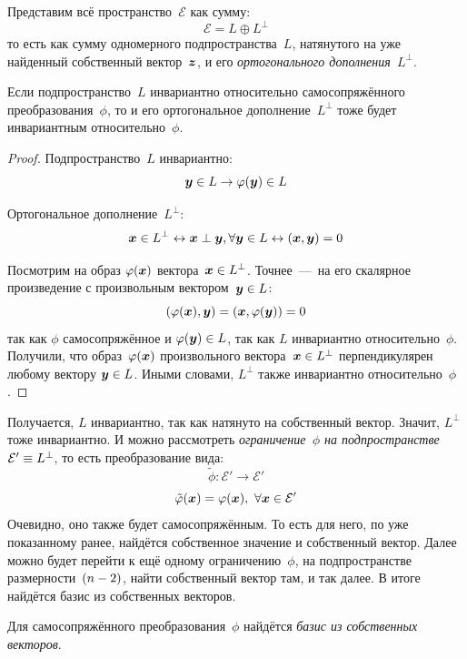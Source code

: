\documentclass[a4paper,12pt]{article}
\theoremstyle{remark}
\begin{document}
  Представим всё пространство~$\mathcal E$ как сумму:
  \[
    \mathcal E = L \oplus L^{\perp}
  \]
  то есть как сумму одномерного подпространства~$L$, натянутого на уже найденный собственный вектор~$\boldsymbol z$, и его \emph{ортогонального дополнения~$L^{\perp}$}.
  
  \begin{proposition}
    Если подпространство~$L$ инвариантно относительно самосопряжённого преобразования~$\phi$, то и его ортогональное дополнение~$L^{\perp}$ тоже будет инвариантным относительно~$\phi$.
  \end{proposition}
  
  \begin{proof}
    Подпространство~$L$ инвариантно:
    \[
      \boldsymbol y \in L \rightarrow \varphi(\boldsymbol y) \in L
    \]
    
    Ортогональное дополнение~$L^{\perp}$:
    \[
      \boldsymbol x \in L^{\perp}
      \leftrightarrow \boldsymbol x \perp \boldsymbol y, \forall \boldsymbol y \in L
      \leftrightarrow (\boldsymbol x, \boldsymbol y) = 0
    \]
    
    Посмотрим на образ $\varphi(\boldsymbol x)$ вектора~$\bds x \hm\in L^{\perp}$.
    Точнее~---~на его скалярное произведение с произвольным вектором~$\bds y \hm\in L$:
    \[
      (\varphi(\boldsymbol x), \boldsymbol y) = (\boldsymbol x, \varphi(\boldsymbol y)) = 0
    \]
    так как $\phi$ самосопряжённое и $\phi(\bds y) \hm\in L$, так как $L$ инвариантно относительно~$\phi$.
    Получили, что образ~$\varphi(\boldsymbol x)$ произвольного вектора~$\bds x \hm\in L^{\perp}$ перпендикулярен любому вектору $\bds y \hm\in L$.
    Иными словами, $L^{\perp}$ также инвариантно относительно~$\phi$.
  \end{proof}
  
  Получается, $L$ инвариантно, так как натянуто на собственный вектор.
  Значит, $L^{\perp}$ тоже инвариантно.
  И можно рассмотреть \emph{ограничение~$\phi$ на подпространстве~$\mathcal E' \hm\equiv L^{\perp}$}, то есть преобразование вида:
  \[
    \tilde\phi\colon \mathcal E' \to \mathcal E'
  \]
  \[
    \tilde{\varphi}(\boldsymbol x) = \varphi(\boldsymbol x),\ \forall \boldsymbol x \in \mathcal E'
  \]
  Очевидно, оно также будет самосопряжённым.
  То есть для него, по уже показанному ранее, найдётся собственное значение и собственный вектор.
  Далее можно будет перейти к ещё одному ограничению~$\phi$, на подпространстве размерности~$(n \hm- 2)$, найти собственный вектор там, и так далее.
  В итоге найдётся базис из собственных векторов.
  
  \begin{theorem}\label{theo:basis-exists}
    Для самосопряжённого преобразования~$\phi$ найдётся \emph{базис из собственных векторов}.
  \end{theorem}
\end{document}
